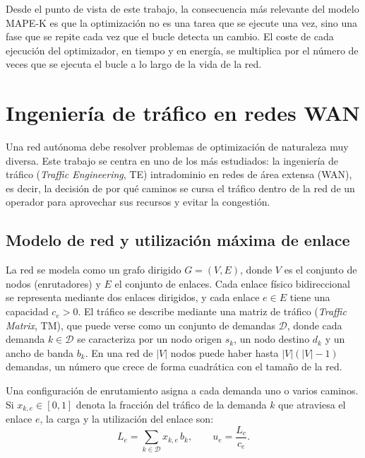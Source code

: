 Desde el punto de vista de este trabajo, la consecuencia más relevante del modelo MAPE-K es que la optimización no es una tarea que se ejecute una vez, sino una fase que se repite cada vez que el bucle detecta un cambio. El coste de cada ejecución del optimizador, en tiempo y en energía, se multiplica por el número de veces que se ejecuta el bucle a lo largo de la vida de la red.

\section{Ingeniería de tráfico en redes WAN}\label{sec:te}

Una red autónoma debe resolver problemas de optimización de naturaleza muy diversa. Este trabajo se centra en uno de los más estudiados: la ingeniería de tráfico (\textit{Traffic Engineering}, TE) intradominio en redes de área extensa (WAN), es decir, la decisión de por qué caminos se cursa el tráfico dentro de la red de un operador para aprovechar sus recursos y evitar la congestión.

\subsection{Modelo de red y utilización máxima de enlace}\label{sec:mlu}

La red se modela como un grafo dirigido $G=(V,E)$, donde $V$ es el conjunto de nodos (enrutadores) y $E$ el conjunto de enlaces. Cada enlace físico bidireccional se representa mediante dos enlaces dirigidos, y cada enlace $e \in E$ tiene una capacidad $c_e > 0$. El tráfico se describe mediante una matriz de tráfico (\textit{Traffic Matrix}, TM), que puede verse como un conjunto de demandas $\mathcal{D}$, donde cada demanda $k \in \mathcal{D}$ se caracteriza por un nodo origen $s_k$, un nodo destino $d_k$ y un ancho de banda $b_k$. En una red de $|V|$ nodos puede haber hasta $|V|(|V|-1)$ demandas, un número que crece de forma cuadrática con el tamaño de la red.

Una configuración de enrutamiento asigna a cada demanda uno o varios caminos. Si $x_{k,e} \in [0,1]$ denota la fracción del tráfico de la demanda $k$ que atraviesa el enlace $e$, la carga y la utilización del enlace son:
\begin{equation}
	L_e = \sum_{k \in \mathcal{D}} x_{k,e}\, b_k, \qquad u_e = \frac{L_e}{c_e}.
\end{equation}

